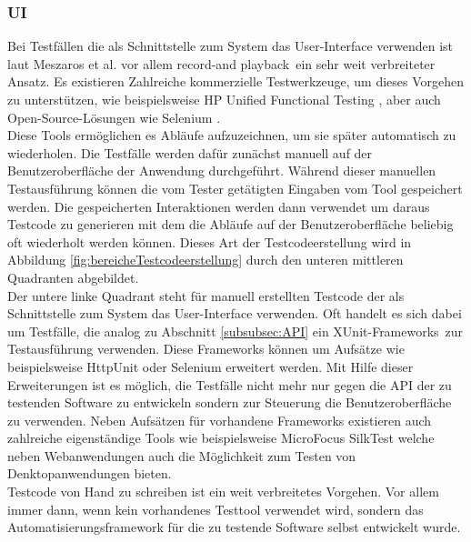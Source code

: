 \subsubsection{UI}
\label{subsubsec:UI}
Bei Testfällen die als Schnittstelle zum System das User-Interface verwenden ist laut  Meszaros et al. \cite{meszaros_agile_2003} vor allem \grq record-and playback\grq\ ein sehr weit verbreiteter Ansatz. Es existieren Zahlreiche kommerzielle Testwerkzeuge, um dieses Vorgehen zu unterstützen, wie beispielsweise HP Unified Functional Testing \cite{hp_testautomatisierung_2015}, aber auch Open-Source-Lösungen wie Selenium \cite{selenium_selenium_2015}.\\
Diese Tools ermöglichen es Abläufe aufzuzeichnen, um sie später automatisch zu wiederholen. Die Testfälle werden dafür zunächst manuell auf der Benutzeroberfläche der Anwendung durchgeführt. Während dieser manuellen Testausführung können die vom Tester getätigten Eingaben vom Tool gespeichert werden. Die gespeicherten Interaktionen werden dann verwendet um daraus Testcode zu generieren mit dem die Abläufe auf der Benutzeroberfläche beliebig oft wiederholt werden können. Dieses Art der Testcodeerstellung wird in Abbildung \ref{fig:bereicheTestcodeerstellung} durch den unteren mittleren Quadranten abgebildet.\\
Der untere linke Quadrant steht für manuell erstellten Testcode der als Schnittstelle zum System das User-Interface verwenden. Oft handelt es sich dabei um Testfälle, die analog zu Abschnitt \ref{subsubsec:API} ein \grq XUnit-Frameworks\grq\ zur Testausführung verwenden. Diese Frameworks können um Aufsätze wie beispielsweise HttpUnit \cite{httpunit_httpunit_2015} oder Selenium \cite{selenium_selenium_2015} erweitert werden. Mit Hilfe dieser Erweiterungen ist es möglich, die Testfälle nicht mehr nur gegen die API der zu testenden Software zu entwickeln sondern zur Steuerung die Benutzeroberfläche zu verwenden. Neben Aufsätzen für vorhandene Frameworks existieren auch zahlreiche eigenständige Tools wie beispielsweise MicroFocus SilkTest \cite{silk_test_borland_2015} welche neben Webanwendungen auch die Möglichkeit zum Testen von Denktopanwendungen bieten.\\
Testcode von Hand zu schreiben ist ein weit verbreitetes Vorgehen. Vor allem immer dann, wenn kein vorhandenes Testtool verwendet wird, sondern das Automatisierungsframework für die zu testende Software selbst entwickelt wurde.


